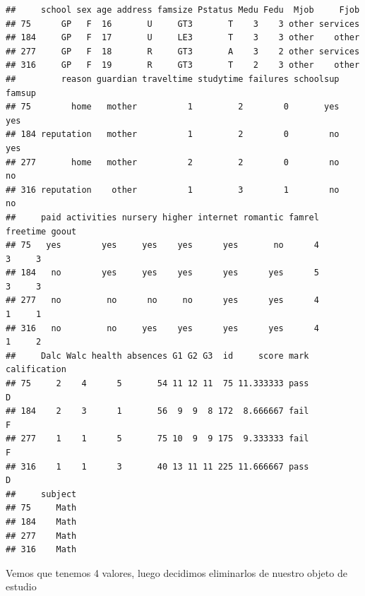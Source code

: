 \documentclass[]{article}
\newenvironment{Shaded}{\begin{snugshade}}{\end{snugshade}}
\newcommand{\DecValTok}[1]{\textcolor[rgb]{0.86,0.86,0.80}{#1}}
\newcommand{\KeywordTok}[1]{\textcolor[rgb]{0.94,0.87,0.69}{#1}}
\newcommand{\NormalTok}[1]{\textcolor[rgb]{0.80,0.80,0.80}{#1}}
\newcommand{\OperatorTok}[1]{\textcolor[rgb]{0.94,0.94,0.82}{#1}}
\newcommand{\StringTok}[1]{\textcolor[rgb]{0.80,0.58,0.58}{#1}}
\begin{document}
\begin{verbatim}
##     school sex age address famsize Pstatus Medu Fedu  Mjob     Fjob
## 75      GP   F  16       U     GT3       T    3    3 other services
## 184     GP   F  17       U     LE3       T    3    3 other    other
## 277     GP   F  18       R     GT3       A    3    2 other services
## 316     GP   F  19       R     GT3       T    2    3 other    other
##         reason guardian traveltime studytime failures schoolsup famsup
## 75        home   mother          1         2        0       yes    yes
## 184 reputation   mother          1         2        0        no    yes
## 277       home   mother          2         2        0        no     no
## 316 reputation    other          1         3        1        no     no
##     paid activities nursery higher internet romantic famrel freetime goout
## 75   yes        yes     yes    yes      yes       no      4        3     3
## 184   no        yes     yes    yes      yes      yes      5        3     3
## 277   no         no      no     no      yes      yes      4        1     1
## 316   no         no     yes    yes      yes      yes      4        1     2
##     Dalc Walc health absences G1 G2 G3  id     score mark calification
## 75     2    4      5       54 11 12 11  75 11.333333 pass            D
## 184    2    3      1       56  9  9  8 172  8.666667 fail            F
## 277    1    1      5       75 10  9  9 175  9.333333 fail            F
## 316    1    1      3       40 13 11 11 225 11.666667 pass            D
##     subject
## 75     Math
## 184    Math
## 277    Math
## 316    Math
\end{verbatim}

Vemos que tenemos 4 valores, luego decidimos eliminarlos de nuestro
objeto de estudio

\begin{Shaded}
\end{Shaded}
\end{document}
